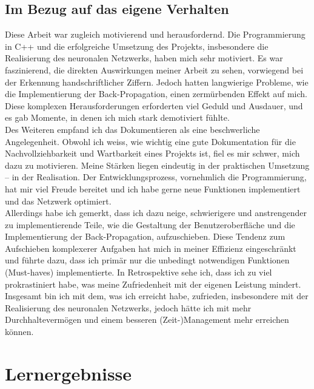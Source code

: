 \subsection{Im Bezug auf das eigene Verhalten}
Diese Arbeit war zugleich motivierend und herausfordernd. Die Programmierung in C++ und die erfolgreiche Umsetzung des Projekts, insbesondere die Realisierung des neuronalen Netzwerks, haben mich sehr motiviert. Es war faszinierend, die direkten Auswirkungen meiner Arbeit zu sehen, vorwiegend bei der Erkennung handschriftlicher Ziffern. Jedoch hatten langwierige Probleme, wie die Implementierung der Back-Propagation, einen zermürbenden Effekt auf mich. Diese komplexen Herausforderungen erforderten viel Geduld und Ausdauer, und es gab Momente, in denen ich mich stark demotiviert fühlte.
\\
Des Weiteren empfand ich das Dokumentieren als eine beschwerliche Angelegenheit. Obwohl ich weiss, wie wichtig eine gute Dokumentation für die Nachvollziehbarkeit und Wartbarkeit eines Projekts ist, fiel es mir schwer, mich dazu zu motivieren. Meine Stärken liegen eindeutig in der praktischen Umsetzung – in der Realisation. Der Entwicklungsprozess, vornehmlich die Programmierung, hat mir viel Freude bereitet und ich habe gerne neue Funktionen implementiert und das Netzwerk optimiert.
\\
Allerdings habe ich gemerkt, dass ich dazu neige, schwierigere und anstrengender zu implementierende Teile, wie die Gestaltung der Benutzeroberfläche und die Implementierung der Back-Propagation, aufzuschieben. Diese Tendenz zum Aufschieben komplexerer Aufgaben hat mich in meiner Effizienz eingeschränkt und führte dazu, dass ich primär nur die unbedingt notwendigen Funktionen (Must-haves) implementierte. In Retrospektive sehe ich, dass ich zu viel prokrastiniert habe, was meine Zufriedenheit mit der eigenen Leistung mindert.
\\
Insgesamt bin ich mit dem, was ich erreicht habe, zufrieden, insbesondere mit der Realisierung des neuronalen Netzwerks, jedoch hätte ich mit mehr Durchhaltevermögen und einem besseren (Zeit-)Management mehr erreichen können.


\section{Lernergebnisse}
